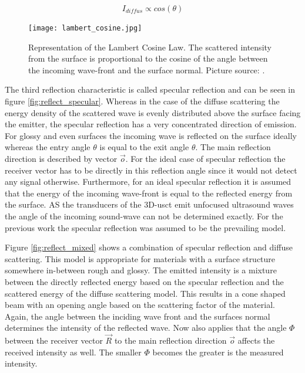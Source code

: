 \begin{equation}
I_{diffus} \propto cos(\theta)
\label{eq:lambert_cosine}
\end{equation}



\begin{figure}[H]
    \centering
    \texttt{[image: lambert\_cosine.jpg]}
    \caption{Representation of the Lambert Cosine Law. The scattered intensity from the surface is proportional to the cosine of the angle between the incoming wave-front and the surface normal. Picture source: \cite{illum_Phong}.}
    \label{Lambert_cosine_law}
\end{figure}


The third reflection characteristic is called specular reflection and can be seen in figure \ref{fig:reflect_specular}. Whereas in the case of the diffuse scattering the energy density of the scattered wave is evenly distributed above the surface facing the emitter, the specular reflection has a very concentrated direction of emission. For glossy and even surfaces the incoming wave is reflected on the surface ideally whereas the entry angle  $\theta$ is equal to the exit angle $\theta$.
The main reflection direction is described by vector $\overrightarrow{o}$. For the ideal case of specular reflection the  receiver vector has to be directly in this reflection angle since it would not detect any signal otherwise.
Furthermore, for an ideal specular reflection it is assumed that the energy of the incoming wave-front is equal to the reflected energy from the surface. AS the transducers of the 3D-\ac{usct} emit unfocused ultrasound waves the angle of the incoming sound-wave can not be determined exactly. For the previous work \cite{PatrickHucker2014EvaluationRuckstreumodells} the specular reflection was assumed to be the prevailing model.


Figure \ref{fig:reflect_mixed} shows a combination of specular reflection and diffuse scattering. This model is appropriate for materials with a surface structure somewhere in-between rough and glossy. The emitted intensity is a mixture between the directly reflected energy based on the specular reflection and the scattered energy of the diffuse scattering model. This results in a cone shaped beam with an opening angle based on the scattering factor of the material. Again, the angle between the inciding wave front and the surfaces normal determines the intensity of the reflected wave. Now also applies that the angle $\Phi$  between the receiver vector $\overrightarrow{R}$ to the main reflection direction $\overrightarrow{o}$ affects the received intensity as well. The smaller $\Phi$ becomes the greater is the measured intensity.








